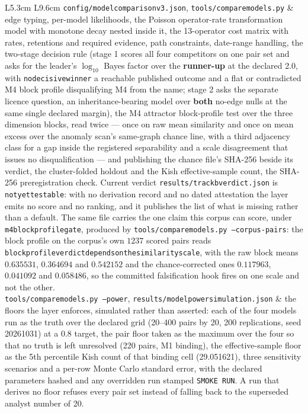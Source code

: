 \documentclass[11pt]{article}
\DeclareRobustCommand{\_}{\textunderscore\allowbreak}
\begin{document}
\begin{longtable}{L{5.3cm} L{9.6cm}}
\texttt{config/model\_comparison\_v3.json}, \texttt{tools/compare\_models.py} & edge typing, per-model likelihoods, the Poisson operator-rate transformation model with monotone decay nested inside it, the 13-operator cost matrix with rates, retentions and required evidence, path constraints, date-range handling, the two-stage decision rule (stage 1 scores all four competitors on one pair set and asks for the leader's \(\log_{10}\) Bayes factor over the \textbf{runner-up} at the declared 2.0, with \texttt{no\_decisive\_winner} a reachable published outcome and a flat or contradicted M4 block profile disqualifying M4 from the name; stage 2 asks the separate licence question, an inheritance-bearing model over \textbf{both} no-edge nulls at the same single declared margin), the M4 attractor block-profile test over the three dimension blocks, read twice --- once on raw mean similarity and once on mean excess over the anomaly scan's same-graph chance line, with a third adjacency class for a gap inside the registered separability and a scale disagreement that issues no disqualification --- and publishing the chance file's SHA-256 beside its verdict, the cluster-folded holdout and the Kish effective-sample count, the SHA-256 preregistration check. Current verdict \texttt{results/track\_b\_verdict.json} is \texttt{not\_yet\_testable}: with no derivation record and no dated attestation the layer emits no score and no ranking, and it publishes the list of what is missing rather than a default. The same file carries the one claim this corpus can score, under \texttt{m4\_block\_profile\_gate}, produced by \texttt{tools/compare\_models.py --corpus-pairs}: the block profile on the corpus's own \(1237\) scored pairs reads \texttt{block\_profile\_verdict\_depends\_on\_the\_similarity\_scale}, with the raw block means \(0.635531\), \(0.364694\) and \(0.542152\) and the chance-corrected ones \(0.117963\), \(0.041092\) and \(0.058486\), so the committed falsification hook fires on one scale and not the other. \\
\texttt{tools/compare\_models.py --power}, \texttt{results/model\_power\_simulation.json} & the floors the layer enforces, simulated rather than asserted: each of the four models run as the truth over the declared grid (20--400 pairs by 20, 200 replications, seed 20261031) at a 0.8 target, the pair floor taken as the maximum over the four so that no truth is left unresolved (220 pairs, M1 binding), the effective-sample floor as the 5th percentile Kish count of that binding cell (29.051621), three sensitivity scenarios and a per-row Monte Carlo standard error, with the declared parameters hashed and any overridden run stamped \texttt{SMOKE RUN}. A run that derives no floor refuses every pair set instead of falling back to the superseded analyst number of 20. \\

\end{longtable}
\end{document}
